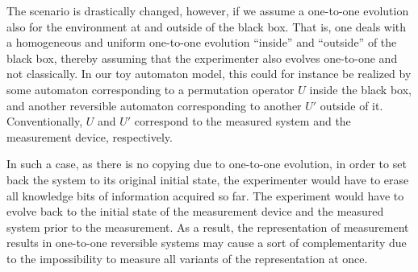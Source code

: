 The scenario is drastically changed, however, if we assume a
one-to-one evolution also for the environment at and outside
of the black box. That is, one deals with a
homogeneous
and uniform one-to-one evolution ``inside'' and ``outside'' of the black
box, thereby
assuming that the experimenter also evolves
one-to-one and not classically.
In our toy automaton model, this could for instance be realized by some
automaton corresponding to a permutation operator $U$ inside the black
box, and another reversible automaton corresponding to another $U'$
outside of it. Conventionally, $U$ and $U'$ correspond to the measured
system and the measurement device, respectively.

In such a case, as there is no copying due to one-to-one evolution,
in order to set
back the system to its original initial state, the experimenter would
have to erase all knowledge bits of information acquired so far.
The experiment would have to evolve back to the initial state of the
measurement device and the measured system prior to the measurement.
As a result, the representation of measurement results in one-to-one
reversible systems may cause a sort of complementarity due to
the impossibility to measure all variants of the representation
at once.

